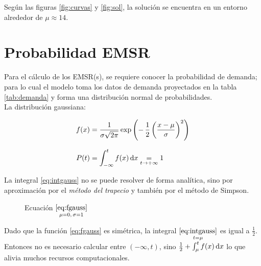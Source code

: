 \documentclass[12pt]{article}
\begin{document}
Según las figuras \ref{fig:curvas} y \ref{fig:sol}, la solución se encuentra en un entorno alrededor de $\mu \approx 14$.









\section{Probabilidad EMSR}


Para el cálculo de los EMSR(s), se requiere conocer la probabilidad de demanda; para lo cual el modelo toma los datos de demanda proyectados en la tabla \ref{tab:demanda} y forma una distribución normal de probabilidades.\\


La distribución gaussiana:

\begin{align}
f(x) &= \dfrac{1}{\sigma\sqrt{2\pi}}\exp\left({-\,\dfrac{1}{2}\left(\dfrac{x-\mu}{\sigma}\right)^2}\right) \label{eq:fgauss} \\[8pt]
P(t) &= \int_{-\infty}^{t} f(x) \dif x \underset{t\to +\infty}{=} 1 \label{eq:intgauss}
\end{align}


La integral \eqref{eq:intgauss} no se puede resolver de forma analítica, sino por aproximación por el \emph{método del trapecio} y también por el método de Simpson.\\



\begin{figure}
\centering
{}
\caption{Ecuación $\underset{\mu = 0,\,\sigma = 1}{\text{\eqref{eq:fgauss}}}$}\label{fig:campana}
\end{figure}



Dado que la función \eqref{eq:fgauss} es simétrica, la integral $\underset{t = \mu}{\text{\eqref{eq:intgauss}}}$ es igual a $\frac{1}{2}$. Entonces no es necesario calcular entre $(-\infty, t)$, sino $\frac{1}{2} + \int_\mu^t f(x)\dif x$ lo que alivia muchos recursos computacionales.
\end{document}
